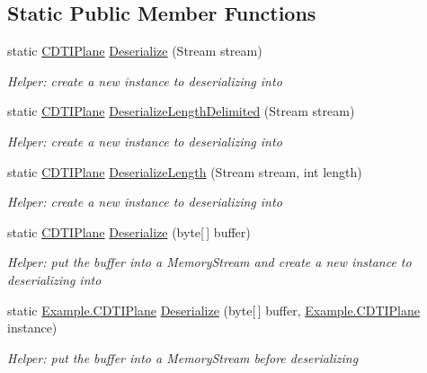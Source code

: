 \subsection*{Static Public Member Functions}
\begin{DoxyCompactItemize}
\item 
static \hyperlink{class_example_1_1_c_d_t_i_plane}{C\+D\+T\+I\+Plane} \hyperlink{class_example_1_1_c_d_t_i_plane_a9b57535386fd8416a21329193c1d4a8d}{Deserialize} (Stream stream)
\begin{DoxyCompactList}\small\item\em Helper\+: create a new instance to deserializing into\end{DoxyCompactList}\item 
static \hyperlink{class_example_1_1_c_d_t_i_plane}{C\+D\+T\+I\+Plane} \hyperlink{class_example_1_1_c_d_t_i_plane_a2a402540634e3e86a57af48860920f8c}{Deserialize\+Length\+Delimited} (Stream stream)
\begin{DoxyCompactList}\small\item\em Helper\+: create a new instance to deserializing into\end{DoxyCompactList}\item 
static \hyperlink{class_example_1_1_c_d_t_i_plane}{C\+D\+T\+I\+Plane} \hyperlink{class_example_1_1_c_d_t_i_plane_a60c2ac4412417d21c958f98f90424487}{Deserialize\+Length} (Stream stream, int length)
\begin{DoxyCompactList}\small\item\em Helper\+: create a new instance to deserializing into\end{DoxyCompactList}\item 
static \hyperlink{class_example_1_1_c_d_t_i_plane}{C\+D\+T\+I\+Plane} \hyperlink{class_example_1_1_c_d_t_i_plane_a4df1a00746b2efa5d9ecbea4a978ef6e}{Deserialize} (byte\mbox{[}$\,$\mbox{]} buffer)
\begin{DoxyCompactList}\small\item\em Helper\+: put the buffer into a Memory\+Stream and create a new instance to deserializing into\end{DoxyCompactList}\item 
static \hyperlink{class_example_1_1_c_d_t_i_plane}{Example.\+C\+D\+T\+I\+Plane} \hyperlink{class_example_1_1_c_d_t_i_plane_a82f32570c03dea0189e0f31acb7f8d0c}{Deserialize} (byte\mbox{[}$\,$\mbox{]} buffer, \hyperlink{class_example_1_1_c_d_t_i_plane}{Example.\+C\+D\+T\+I\+Plane} instance)
\begin{DoxyCompactList}\small\item\em Helper\+: put the buffer into a Memory\+Stream before deserializing\end{DoxyCompactList}\item 

\end{DoxyCompactItemize}
